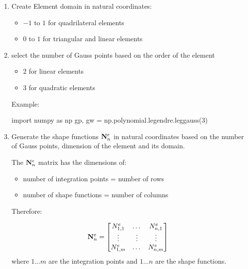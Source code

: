 \begin{enumerate}
    \item Create Element domain in natural coordinates:
        \begin{itemize}
            \item $ -1 $ to $ 1 $ for quadrilateral elements
            \item $ 0 $ to $ 1 $ for triangular and linear elements
        \end{itemize}

    \item select the number of Gauss points based on the order of the element
        \begin{itemize}
            \item $ 2 $ for linear elements
            \item $ 3 $ for quadratic elements
        \end{itemize}

        Example:
        \begin{python}
import numpy as np
gp, gw = np.polynomial.legendre.leggauss(3)
        \end{python}

    \item Generate the shape functions $ \mathbf{N}_n^e $ in natural coordinates
        based on the number of Gauss points, dimension of the element and its domain.

        The $ \mathbf{N}_n^e $ matrix has the dimensions of:
        \begin{itemize}
            \item number of integration points = number of rows
            \item number of shape functions = number of columns
        \end{itemize}

        Therefore:

        \begin{equation}
            \mathbf{N}_n^e = \begin{bmatrix}
                N_{1,1}^e & \dots & N_{n,1}^e\\
                \vdots & \vdots & \vdots\\
                N_{1,m}^e & \dots & N_{n,m}^e
            \end{bmatrix}
        \end{equation}
         where $ 1 \dots m $ are the integration points and $ 1 \dots n $ are the shape
         functions.


\end{enumerate}

